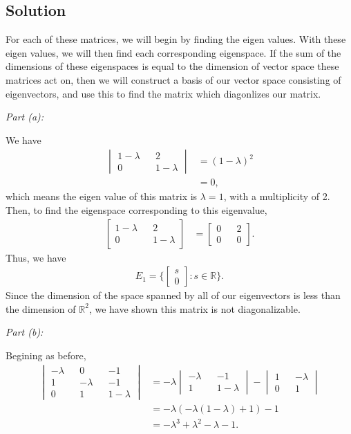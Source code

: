 \documentclass[10pt,a4paper]{article}
\makeatletter
\newcommand{\proofpart}[2]{%
  \par
  \addvspace{\medskipamount}%
  \noindent\emph{Part #1: #2}\par\nobreak
  \addvspace{\smallskipamount}%
  \@afterheading
}
\theoremstyle{definition}
\makeatother
\begin{document}
\subsection*{Solution}
For each of these matrices, we will begin by finding the eigen values. With these eigen values, we will then find each corresponding eigenspace. If the sum of the dimensions of these eigenspaces is equal to the dimension of vector space these matrices act on, then we will construct a basis of our vector space consisting of eigenvectors, and use this to find the matrix which diagonlizes our matrix.
\proofpart{(a)}{} We have
\begin{align*}
\begin{vmatrix}
1 - \lambda && 2\\
0 && 1 - \lambda
\end{vmatrix} &= (1 - \lambda)^2\\
&= 0,
\end{align*}
which means the eigen value of this matrix is $\lambda = 1$, with a multiplicity of 2. Then, to find the eigenspace corresponding to this eigenvalue,
\begin{align*}
\begin{bmatrix}
1 - \lambda && 2\\
0 && 1 - \lambda
\end{bmatrix} &= \begin{bmatrix}
0 && 2\\
0 && 0
\end{bmatrix}.
\end{align*}
Thus, we have
\begin{align*}
E_1 = \Biggl\{ \begin{bmatrix}
s\\
0
\end{bmatrix} : s \in \mathbb{R} \Biggr\}.
\end{align*}
Since the dimension of the space spanned by all of our eigenvectors is less than the dimension of $\mathbb{R}^2$, we have shown this matrix is not diagonalizable.
\proofpart{(b)}{} Begining as before,
\begin{align*}
\begin{vmatrix}
-\lambda && 0 && -1\\
1 && -\lambda && -1\\
0 && 1 && 1 - \lambda
\end{vmatrix} &= -\lambda \begin{vmatrix}
-\lambda && -1\\
1 && 1 - \lambda \end{vmatrix} - \begin{vmatrix}
1 && -\lambda\\
0 && 1
\end{vmatrix}\\
&= -\lambda (-\lambda(1 - \lambda) + 1) - 1\\
&= -\lambda^3 + \lambda^2  - \lambda - 1.
\end{align*}
\end{document}
